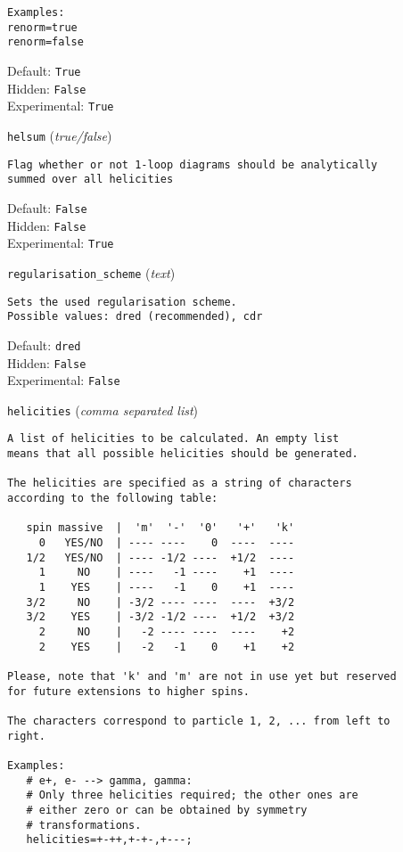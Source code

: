 \begin{basedescript}{\desclabelstyle{\pushlabel}}
\begin{verbatim}
Examples:
renorm=true
renorm=false
\end{verbatim}
Default: \verb|True|
\\Hidden: \verb|False|
\\Experimental: \verb|True|
\\\item[\colorbox{gray!30}{\texttt{helsum}}] (\textit{true/false})
\begin{verbatim}
Flag whether or not 1-loop diagrams should be analytically
summed over all helicities
\end{verbatim}
Default: \verb|False|
\\Hidden: \verb|False|
\\Experimental: \verb|True|
\\\item[\colorbox{gray!30}{\texttt{regularisation\_scheme}}] (\textit{text})
\begin{verbatim}
Sets the used regularisation scheme.
Possible values: dred (recommended), cdr
\end{verbatim}
Default: \verb|dred|
\\Hidden: \verb|False|
\\Experimental: \verb|False|
\\\item[\colorbox{gray!30}{\texttt{helicities}}] (\textit{comma separated list})
\begin{verbatim}
A list of helicities to be calculated. An empty list
means that all possible helicities should be generated.

The helicities are specified as a string of characters
according to the following table:

   spin massive  |  'm'  '-'  '0'   '+'   'k'
     0   YES/NO  | ---- ----    0  ----  ----
   1/2   YES/NO  | ---- -1/2 ----  +1/2  ----
     1     NO    | ----   -1 ----    +1  ----
     1    YES    | ----   -1    0    +1  ----
   3/2     NO    | -3/2 ---- ----  ----  +3/2
   3/2    YES    | -3/2 -1/2 ----  +1/2  +3/2
     2     NO    |   -2 ---- ----  ----    +2
     2    YES    |   -2   -1    0    +1    +2

Please, note that 'k' and 'm' are not in use yet but reserved
for future extensions to higher spins.

The characters correspond to particle 1, 2, ... from left to
right.

Examples:
   # e+, e- --> gamma, gamma:
   # Only three helicities required; the other ones are
   # either zero or can be obtained by symmetry
   # transformations.
   helicities=+-++,+-+-,+---;


\end{verbatim}
\end{basedescript}
